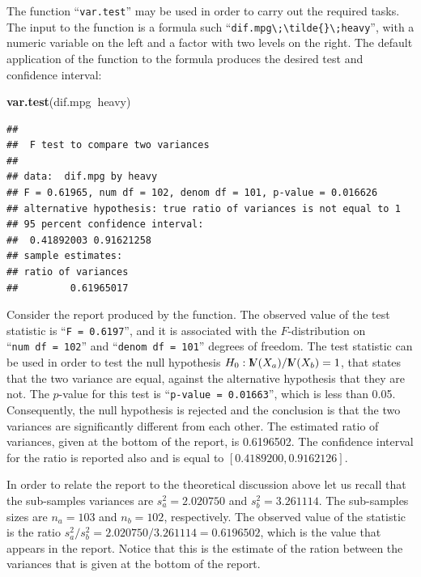 \documentclass[]{krantz}
\makeatletter
\newenvironment{Shaded}{\begin{snugshade}}{\end{snugshade}}
\newcommand{\KeywordTok}[1]{\textcolor[rgb]{0.13,0.29,0.53}{\textbf{#1}}}
\newcommand{\NormalTok}[1]{#1}
\newcommand{\OperatorTok}[1]{\textcolor[rgb]{0.81,0.36,0.00}{\textbf{#1}}}
\newcommand{\Var}{{\rm I\kern-.3em V}}
\newenvironment{kframe}{%
\medskip{}
\setlength{\fboxsep}{.8em}
 \def\at@end@of@kframe{}%
 \ifinner\ifhmode%
  \def\at@end@of@kframe{\end{minipage}}%
  \begin{minipage}{\columnwidth}%
 \fi\fi%
 \def\FrameCommand##1{\hskip\@totalleftmargin \hskip-\fboxsep
 \colorbox{shadecolor}{##1}\hskip-\fboxsep
     \hskip-\linewidth \hskip-\@totalleftmargin \hskip\columnwidth}%
 \MakeFramed {\advance\hsize-\width
   \@totalleftmargin\z@ \linewidth\hsize
   \@setminipage}}%
 {\par\unskip\endMakeFramed%
 \at@end@of@kframe}
\renewenvironment{Shaded}{\begin{kframe}}{\end{kframe}}
\theoremstyle{definition}
\theoremstyle{definition}
\theoremstyle{definition}
\theoremstyle{remark}
\makeatother
\begin{document}
The function ``\texttt{var.test}'' may be used in order to carry out the required
tasks. The input to the function is a formula such
``\texttt{dif.mpg\textbackslash{};\textbackslash{}tilde\{\}\textbackslash{};heavy}'', with a numeric variable on the left and a
factor with two levels on the right. The default application of the
function to the formula produces the desired test and confidence
interval:

\begin{Shaded}
\begin{Highlighting}[]
\KeywordTok{var.test}\NormalTok{(dif.mpg}\OperatorTok{~}\NormalTok{heavy)}
\end{Highlighting}
\end{Shaded}

\begin{verbatim}
## 
##  F test to compare two variances
## 
## data:  dif.mpg by heavy
## F = 0.61965, num df = 102, denom df = 101, p-value = 0.016626
## alternative hypothesis: true ratio of variances is not equal to 1
## 95 percent confidence interval:
##  0.41892003 0.91621258
## sample estimates:
## ratio of variances 
##         0.61965017
\end{verbatim}

Consider the report produced by the function. The observed value of the
test statistic is ``\texttt{F\ =\ 0.6197}'', and it is associated with the
\(F\)-distribution on ``\texttt{num\ df\ =\ 102}'' and ``\texttt{denom\ df\ =\ 101}'' degrees of
freedom. The test statistic can be used in order to test the null
hypothesis \(H_0: \Var(X_a)/\Var(X_b) = 1\), that states that the two
variance are equal, against the alternative hypothesis that they are
not. The \(p\)-value for this test is ``\texttt{p-value\ =\ 0.01663}'', which is less
than 0.05. Consequently, the null hypothesis is rejected and the
conclusion is that the two variances are significantly different from
each other. The estimated ratio of variances, given at the bottom of the
report, is 0.6196502. The confidence interval for the ratio is reported
also and is equal to \([0.4189200, 0.9162126]\).

In order to relate the report to the theoretical discussion above let us
recall that the sub-samples variances are \(s^2_a = 2.020750\) and
\(s_b^2 = 3.261114\). The sub-samples sizes are \(n_a = 103\) and
\(n_b = 102\), respectively. The observed value of the statistic is the
ratio \(s_a^2/s_b^2 = 2.020750/3.261114 = 0.6196502\), which is the value
that appears in the report. Notice that this is the estimate of the
ration between the variances that is given at the bottom of the report.
\end{document}
